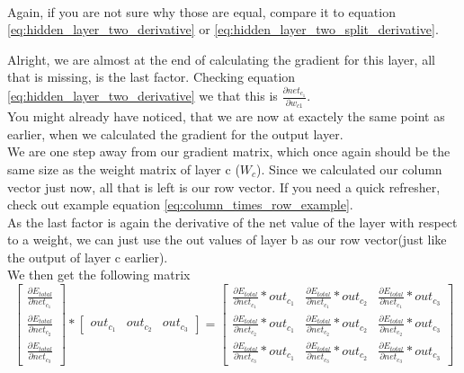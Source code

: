 \documentclass[11pt, halfparskip]{article}
\begin{document}
    \noindent \\
    Again, if you are not sure why those are equal, compare it to equation \ref{eq:hidden_layer_two_derivative} or \ref{eq:hidden_layer_two_split_derivative}.
    
    \newpage \noindent
    Alright, we are almost at the end of calculating the gradient for this layer, all that is missing, is the last factor. Checking equation \ref{eq:hidden_layer_two_derivative} we that
    this is $\frac{\partial net_{c_1}}{\partial w_{c1}}$.\\
    You might already have noticed, that we are now at exactely the same point as earlier, when we calculated the gradient for the output layer.\\
    We are one step away from our gradient matrix, which once again should be the same size as the weight matrix of layer c ($W_c$). Since we calculated our column vector just
    now, all that is left is our row vector. If you need a quick refresher, check out example equation \ref{eq:column_times_row_example}.\\
    As the last factor is again the derivative of the net value of the layer with respect to a weight, we can just use the out values of layer b as our row vector(just like the output of
    layer c earlier).\\
    We then get the following matrix
    \[
    	\begin{bmatrix}
    		\frac{\partial E_{total}}{\partial net_{c_1}}\\
    		\frac{\partial E_{total}}{\partial net_{c_2}}\\
    		\frac{\partial E_{total}}{\partial net_{c_3}}
    	\end{bmatrix}
    	*
    	\begin{bmatrix}
    		out_{c_1} & out_{c_2} & out_{c_3}
    	\end{bmatrix}
    	=
    	\begin{bmatrix}
    		\frac{\partial E_{total}}{\partial net_{c_1}} * out_{c_1} & \frac{\partial E_{total}}{\partial net_{c_1}} * out_{c_2}
    		& \frac{\partial E_{total}}{\partial net_{c_1}} * out_{c_3}\\
    		\frac{\partial E_{total}}{\partial net_{c_2}} * out_{c_1} & \frac{\partial E_{total}}{\partial net_{c_2}} * out_{c_2}
    		& \frac{\partial E_{total}}{\partial net_{c_2}} * out_{c_3}\\
    		\frac{\partial E_{total}}{\partial net_{c_3}} * out_{c_1} & \frac{\partial E_{total}}{\partial net_{c_3}} * out_{c_2}
    		& \frac{\partial E_{total}}{\partial net_{c_3}} * out_{c_3}
    	\end{bmatrix}
    \]
\end{document}

